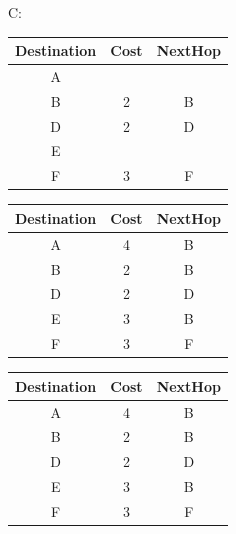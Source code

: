 \documentclass[12pt]{article}
\begin{document}
C:\\
\begin{tabular}{|c|c|c|}
	\hline
	Destination & Cost & NextHop \\\hline
	\hline
	A           &      &         \\\hline
	B           & 2    & B       \\\hline
	D           & 2    & D       \\\hline
	E           &      &         \\\hline
	F           & 3    & F       \\\hline
\end{tabular}
\begin{tabular}{|c|c|c|}
	\hline
	Destination & Cost & NextHop \\\hline
	\hline
	A           & 4    & B       \\\hline
	B           & 2    & B       \\\hline
	D           & 2    & D       \\\hline
	E           & 3    & B       \\\hline
	F           & 3    & F       \\\hline
\end{tabular}
\begin{tabular}{|c|c|c|}
	\hline
	Destination & Cost & NextHop \\\hline
	\hline
	A           & 4    & B       \\\hline
	B           & 2    & B       \\\hline
	D           & 2    & D       \\\hline
	E           & 3    & B       \\\hline
	F           & 3    & F       \\\hline
\end{tabular}\\[3mm]
\end{document}
